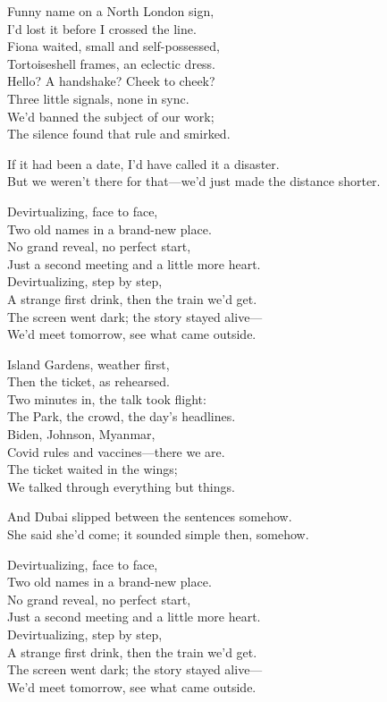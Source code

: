 \begin{lyrics}
Funny name on a North London sign,\\
I’d lost it before I crossed the line.\\
Fiona waited, small and self-possessed,\\
Tortoiseshell frames, an eclectic dress.\\
Hello? A handshake? Cheek to cheek?\\
Three little signals, none in sync.\\
We’d banned the subject of our work;\\
The silence found that rule and smirked.

If it had been a date, I’d have called it a disaster.\\
But we weren’t there for that—we’d just made the distance shorter.

Devirtualizing, face to face,\\
Two old names in a brand-new place.\\
No grand reveal, no perfect start,\\
Just a second meeting and a little more heart.\\
Devirtualizing, step by step,\\
A strange first drink, then the train we’d get.\\
The screen went dark; the story stayed alive—\\
We’d meet tomorrow, see what came outside.

Island Gardens, weather first,\\
Then the ticket, as rehearsed.\\
Two minutes in, the talk took flight:\\
The Park, the crowd, the day’s headlines.\\
Biden, Johnson, Myanmar,\\
Covid rules and vaccines—there we are.\\
The ticket waited in the wings;\\
We talked through everything but things.

And Dubai slipped between the sentences somehow.\\
She said she’d come; it sounded simple then, somehow.

Devirtualizing, face to face,\\
Two old names in a brand-new place.\\
No grand reveal, no perfect start,\\
Just a second meeting and a little more heart.\\
Devirtualizing, step by step,\\
A strange first drink, then the train we’d get.\\
The screen went dark; the story stayed alive—\\
We’d meet tomorrow, see what came outside.


\end{lyrics}
